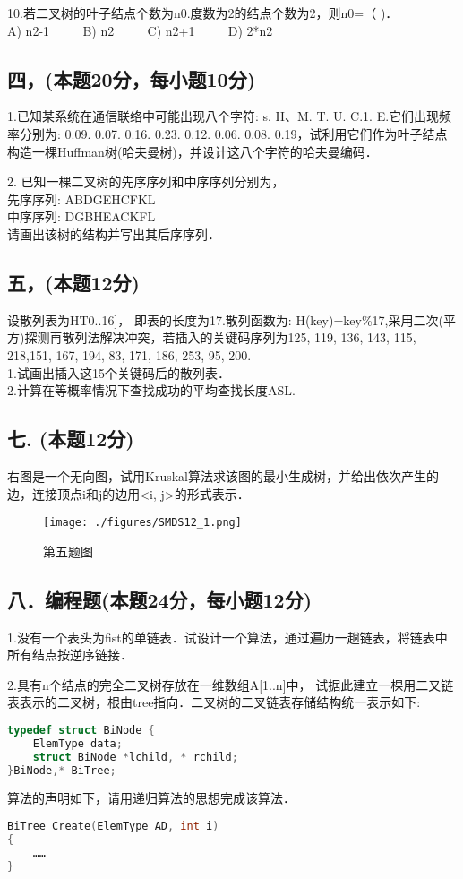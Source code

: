 10.若二叉树的叶子结点个数为n0.度数为2的结点个数为2，则n0=（ )． \\
A) n2-1 $\qquad$ B) n2 $\qquad$ C) n2+1 $\qquad$ D) 2*n2

\subsection{四，(本题20分，每小题10分)}

1.已知某系统在通信联络中可能出现八个字符: s. H、M. T. U. C.1. E.它们出现频率分别为: 0.09. 0.07. 0.16. 0.23. 0.12. 0.06. 0.08. 0.19，试利用它们作为叶子结点构造一棵Huffman树(哈夫曼树)，并设计这八个字符的哈夫曼编码．

2. 已知一棵二叉树的先序序列和中序序列分别为， \\
先序序列: ABDGEHCFKL \\
中序序列: DGBHEACKFL \\
请画出该树的结构并写出其后序序列．

\subsection{五，(本题12分)}
设散列表为HT0..16]， 即表的长度为17.散列函数为: H(key)=key\%17,采用二次(平方)探测再散列法解决冲突，若插入的关键码序列为{125, 119, 136, 143, 115, 218,151, 167, 194, 83, 171, 186, 253, 95, 200}. \\
1.试画出插入这15个关键码后的散列表． \\
2.计算在等概率情况下查找成功的平均查找长度ASL.

\subsection{七. (本题12分)}
右图是一个无向图，试用Kruskal算法求该图的最小生成树，并给出依次产生的边，连接顶点i和j的边用<i, j>的形式表示．
\begin{figure}[ht]
\centering
\texttt{[image: ./figures/SMDS12\_1.png]}
\caption{第五题图} \label{SMDS12_fig1}
\end{figure}

\subsection{八．编程题(本题24分，每小题12分)}

1.没有一个表头为fist的单链表．试设计一个算法，通过遍历一趟链表，将链表中所有结点按逆序链接．

2.具有n个结点的完全二叉树存放在一维数组A[1..n]中， 试据此建立一棵用二又链表表示的二叉树，根由tree指向．二叉树的二叉链表存储结构统一表示如下:
\begin{lstlisting}[language=cpp]
typedef struct BiNode {
    ElemType data;
    struct BiNode *lchild, * rchild;
}BiNode,* BiTree;
\end{lstlisting}
算法的声明如下，请用递归算法的思想完成该算法．
\begin{lstlisting}[language=cpp]
BiTree Create(ElemType AD, int i)
{
    ……
}
\end{lstlisting}
